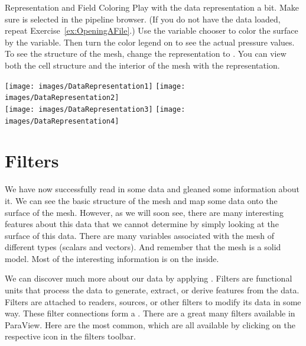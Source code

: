 \begin{exercise}{Representation and Field Coloring}
  \label{ex:RepresentationAndFieldColoring}%
  Play with the data representation a bit.  Make sure
   is selected in the pipeline browser.  (If you do
  not have the data loaded, repeat Exercise~\ref{ex:OpeningAFile}.)  Use
  the variable chooser to color the surface by the  variable.
  Then turn the color legend on to see the actual pressure values.  To see
  the structure of the mesh, change the representation to .  You can view both the cell structure and the interior of the
  mesh with the  representation.

  \begin{inlinefig}
    \texttt{[image: images/DataRepresentation1]}
    \texttt{[image: images/DataRepresentation2]} \\
    \texttt{[image: images/DataRepresentation3]}
    \texttt{[image: images/DataRepresentation4]}
  \end{inlinefig}
\end{exercise}



\section{Filters}


We have now successfully read in some data and gleaned some information
about it.  We can see the basic structure of the mesh and map some data
onto the surface of the mesh.  However, as we will soon see, there are many
interesting features about this data that we cannot determine by simply
looking at the surface of this data.  There are many variables associated
with the mesh of different types (scalars and vectors).  And remember that
the mesh is a solid model.  Most of the interesting information is on the
inside.

We can discover much more about our data by applying .
Filters are functional units that process the data to generate, extract, or
derive features from the data.  Filters are attached to readers, sources,
or other filters to modify its data in some way.  These filter connections
form a .  There are a great many filters
available in ParaView.  Here are the most common, which are all available
by clicking on the respective icon in the filters toolbar.

